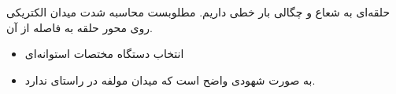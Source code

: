 \begin{ELexample}{}

حلقه‌ای به شعاع  و چگالی بار خطی \ELim{\rho_\ell} داریم. مطلوبست محاسبه شدت میدان الکتریکی روی محور حلقه به فاصله  از آن.


\begin{ELsolution}


\begin{itemize}
\tightlist
\item
  انتخاب دستگاه مختصات استوانه‌ای
\end{itemize}


\begin{itemize}
\tightlist
\item
  به صورت شهودی واضح است که میدان مولفه در راستای  ندارد.
\end{itemize}


\end{ELsolution}

\end{ELexample}


